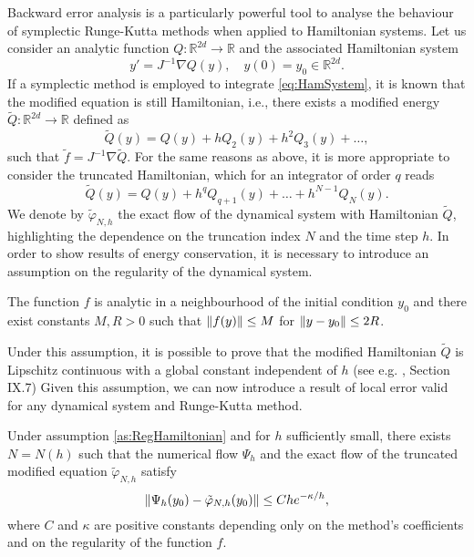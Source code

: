 \documentclass{siamart1116}
\numberwithin{theorem}{section}
\DeclarePairedDelimiter{\norm}{\|}{\|}
\renewcommand{\phi}{\varphi}
\newcommand{\R}{\mathbb{R}}
\newcommand{\corr}[1]{{\color{red}#1}}
\begin{document}
Backward error analysis is a particularly powerful tool to analyse the behaviour of symplectic Runge-Kutta methods when applied to Hamiltonian systems. Let us consider an analytic function $Q \colon \R^{2d} \to \R$ and the associated Hamiltonian system
\begin{equation}\label{eq:HamSystem}
y' = J^{-1}\nabla Q(y), \quad y(0) = y_0 \in \R^{2d}.
\end{equation}
If a symplectic method is employed to integrate \eqref{eq:HamSystem}, it is known that the modified equation is still Hamiltonian, i.e., there exists a modified energy $\tilde Q \colon \R^{2d} \to \R$ defined as
\begin{equation}\label{eq:ModifiedHamiltonian}
\tilde Q(y) = Q(y) + h Q_2(y) + h^2 Q_3(y) + \ldots,
\end{equation}
such that $\tilde f = J^{-1}\nabla \tilde Q$. For the same reasons as above, it is more appropriate to consider the truncated Hamiltonian, which for an integrator of order $q$ reads
\begin{equation}\label{eq:ModifiedHamiltonianTrunc}
	\tilde Q(y) = Q(y) + h^q Q_{q+1}(y) + \ldots + h^{N-1} Q_N(y).
\end{equation}
\corr{We denote by $\tilde \phi_{N, h}$ the exact flow of the dynamical system with Hamiltonian $\tilde Q$, highlighting the dependence on the truncation index $N$ and the time step $h$}. In order to show results of energy conservation, it is necessary to introduce an assumption on the regularity of the dynamical system.

\begin{assumption}\label{as:RegHamiltonian} The function $f$ is analytic in a neighbourhood of the initial condition $y_0$ and there exist constants $M, R > 0$ such that $\norm{f(y)} \leq M$ for $\norm{y - y_0} \leq 2R$.
\end{assumption}

\corr{Under this assumption, it is possible to prove that the modified Hamiltonian $\tilde Q$ is Lipschitz continuous with a global constant independent of $h$ (see e.g. \cite{HLW06}, Section IX.7)} Given this assumption, we can now introduce a result of local error valid for any dynamical system and Runge-Kutta method.

\begin{lemma}[\corr{see e.g. \cite{HLW06}, Section IX.7}]\label{lem:LocalHamiltonianDet} Under assumption \ref{as:RegHamiltonian} and for $h$ sufficiently small, there exists $N = N(h)$ such that the numerical flow $\Psi_h$ and the exact flow of the truncated modified equation $\tilde \phi_{N, h}$ satisfy
	\begin{equation}
	\norm{\Psi_h(y_0) - \tilde \phi_{N, h}(y_0)} \leq C h e^{-\kappa / h},
	\end{equation}
	where $C$ and $\kappa$ are positive constants depending only on the method's coefficients and on the regularity of the function $f$.
\end{lemma}
\end{document}
